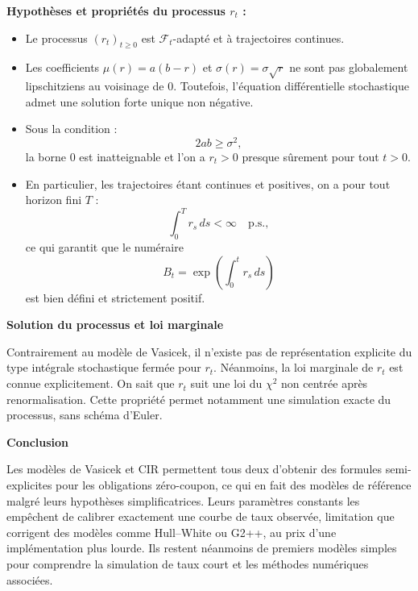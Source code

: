 \textbf{Hypothèses et propriétés du processus $r_t$ :}
\begin{itemize}
    \item Le processus $(r_t)_{t\ge 0}$ est $\mathcal{F}_t$-adapté et à trajectoires continues.
    \item Les coefficients $\mu(r)=a(b-r)$ et $\sigma(r)=\sigma\sqrt{r}$ ne sont pas globalement lipschitziens au voisinage de $0$. Toutefois, l’équation différentielle stochastique admet une solution forte unique non négative.
    \item Sous la condition :
    \begin{equation}
        2ab \ge \sigma^2,
    \end{equation}
    la borne $0$ est inatteignable et l’on a $r_t>0$ presque sûrement pour tout $t>0$.
    \item En particulier, les trajectoires étant continues et positives, on a pour tout horizon fini $T$ :
    \begin{equation}
        \int_0^T r_s\,ds < \infty \quad \text{p.s.},
    \end{equation}
    ce qui garantit que le numéraire
    \[
        B_t=\exp\left(\int_0^t r_s\,ds\right)
    \]
    est bien défini et strictement positif.
\end{itemize}

\medskip

\textbf{Solution du processus et loi marginale}

Contrairement au modèle de Vasicek, il n’existe pas de représentation explicite du type intégrale stochastique fermée pour $r_t$.  
Néanmoins, la loi marginale de $r_t$ est connue explicitement. On sait que $r_t$ suit une loi du $\chi^2$ non centrée après renormalisation.
Cette propriété permet notamment une simulation exacte du processus, sans schéma d’Euler.

\medskip

\textbf{Conclusion}

Les modèles de Vasicek et CIR permettent tous deux d'obtenir des formules semi-explicites pour les obligations zéro-coupon, ce qui en fait des modèles de référence malgré leurs hypothèses simplificatrices.
Leurs paramètres constants les empêchent de calibrer exactement une courbe de taux observée, limitation que corrigent des modèles comme Hull--White ou G2++, au prix d'une implémentation plus lourde.
Ils restent néanmoins de premiers modèles simples pour comprendre la simulation de taux court et les méthodes numériques associées.

